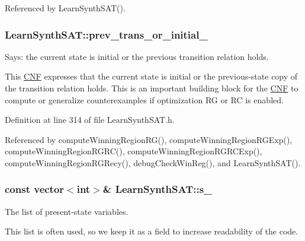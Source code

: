 Referenced by Learn\-Synth\-S\-A\-T().

\hypertarget{classLearnSynthSAT_a6289a4f041ca85ce44a33143fab42888}{
\subsubsection[{prev\-\_\-trans\-\_\-or\-\_\-initial\-\_\-}]{ Learn\-Synth\-S\-A\-T\-::prev\-\_\-trans\-\_\-or\-\_\-initial\-\_\-\hspace{0.3cm}{\ttfamily [protected]}}}\label{classLearnSynthSAT_a6289a4f041ca85ce44a33143fab42888}


Says\-: the current state is initial or the previous transition relation holds. 

This \hyperlink{classCNF}{C\-N\-F} expresses that the current state is initial or the previous-\/state copy of the transition relation holds. This is an important building block for the \hyperlink{classCNF}{C\-N\-F} to compute or generalize counterexamples if optimization R\-G or R\-C is enabled. 

Definition at line 314 of file Learn\-Synth\-S\-A\-T.\-h.



Referenced by compute\-Winning\-Region\-R\-G(), compute\-Winning\-Region\-R\-G\-Exp(), compute\-Winning\-Region\-R\-G\-R\-C(), compute\-Winning\-Region\-R\-G\-R\-C\-Exp(), compute\-Winning\-Region\-R\-G\-Recy(), debug\-Check\-Win\-Reg(), and Learn\-Synth\-S\-A\-T().

\hypertarget{classLearnSynthSAT_a4892998e28f276d7b1a1b02e80799f76}{
\subsubsection[{s\-\_\-}]{\setlength{\rightskip}{0pt plus 5cm}const vector$<$int$>$\& Learn\-Synth\-S\-A\-T\-::s\-\_\-\hspace{0.3cm}{\ttfamily [protected]}}}\label{classLearnSynthSAT_a4892998e28f276d7b1a1b02e80799f76}


The list of present-\/state variables. 

This list is often used, so we keep it as a field to increase readability of the code. 

